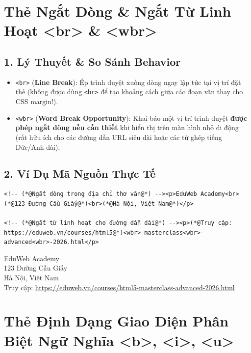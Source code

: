 \documentclass[11pt,oneside]{book}
\newcommand{\codeinline}[1]{\textcolor{accentOrange}{\texttt{#1}}}
\newcommand{\term}[1]{\textbf{\textcolor{primaryBlue}{#1}}}
\begin{document}
\section{Thẻ Ngắt Dòng \& Ngắt Từ Linh Hoạt <br> \& <wbr>}
\subsection{1. Lý Thuyết \& So Sánh Behavior}
\begin{itemize}
    \item \codeinline{<br>} (\term{Line Break}): Ép trình duyệt xuống dòng ngay lập tức tại vị trí đặt thẻ (không được dùng \codeinline{<br>} để tạo khoảng cách giữa các đoạn văn thay cho CSS margin!).
    \item \codeinline{<wbr>} (\term{Word Break Opportunity}): Khai báo một vị trí trình duyệt \textbf{được phép ngắt dòng nếu cần thiết} khi hiển thị trên màn hình nhỏ di động (rất hữu ích cho các đường dẫn URL siêu dài hoặc các từ ghép tiếng Đức/Anh dài).
\end{itemize}

\subsection{2. Ví Dụ Mã Nguồn Thực Tế}
\begin{codeWindow}
\begin{lstlisting}[language=HTML5]
<!-- (*@Ngắt dòng trong địa chỉ thơ văn@*) --><p>EduWeb Academy<br>(*@123 Đường Cầu Giấy@*)<br>(*@Hà Nội, Việt Nam@*)</p>

<!-- (*@Ngắt từ linh hoạt cho đường dẫn dài@*) --><p>(*@Truy cập: https://eduweb.vn/courses/html5@*)<wbr>-masterclass<wbr>-advanced<wbr>-2026.html</p>
\end{lstlisting}
\end{codeWindow}

\begin{browserWindow}
\sffamily\small
EduWeb Academy\\
123 Đường Cầu Giấy\\
Hà Nội, Việt Nam\\[6pt]
Truy cập: \textcolor{primaryBlue}{\underline{https://eduweb.vn/courses/html5-masterclass-advanced-2026.html}}
\end{browserWindow}

\section{Thẻ Định Dạng Giao Diện Phân Biệt Ngữ Nghĩa <b>, <i>, <u>}
\end{document}
